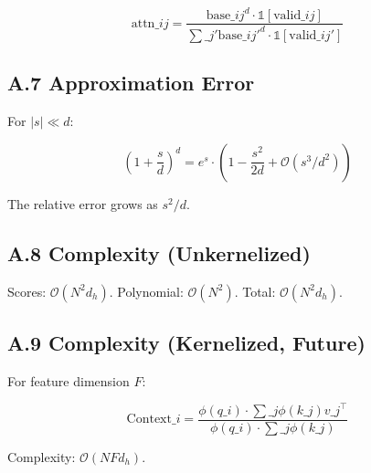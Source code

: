 \[
\text{attn}\_{ij} = \frac{\text{base}\_{ij}^d \cdot \mathbb{1}[\text{valid}\_{ij}]}{\sum\_{j'} \text{base}\_{ij'}^d \cdot \mathbb{1}[\text{valid}\_{ij'}]}
\tag{A.7}
\]

\subsection{A.7 Approximation Error}

For $|s| \ll d$:

\[
\left(1 + \frac{s}{d}\right)^d = e^s \cdot \left(1 - \frac{s^2}{2d} + \mathcal{O}(s^3/d^2)\right)
\tag{A.8}
\]

The relative error grows as $s^2/d$.

\subsection{A.8 Complexity (Unkernelized)}

Scores: $\mathcal{O}(N^2 d_h)$.
Polynomial: $\mathcal{O}(N^2)$.
Total: $\mathcal{O}(N^2 d_h)$.

\subsection{A.9 Complexity (Kernelized, Future)}

For feature dimension $F$:

\[
\text{Context}\_i = \frac{\phi(q\_i) \cdot \sum\_j \phi(k\_j) v\_j^\top}{\phi(q\_i) \cdot \sum\_j \phi(k\_j)}
\tag{A.9}
\]

Complexity: $\mathcal{O}(N F d_h)$.


